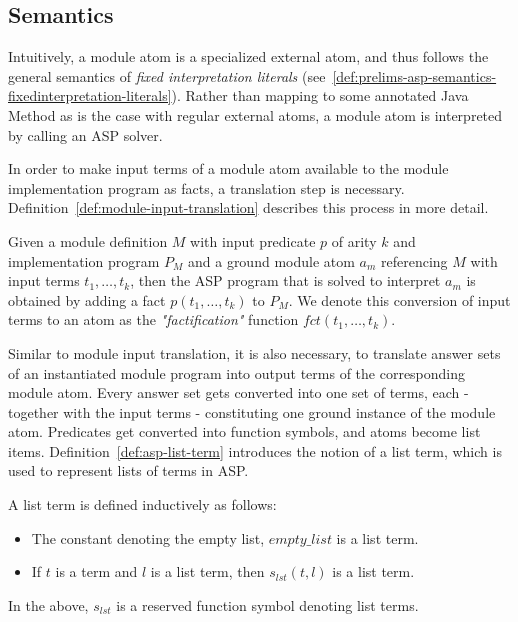 \subsection{Semantics}
\label{subsec:evolog-modules-semantics}

Intuitively, a module atom is a specialized external atom, and thus follows the general semantics of \emph{fixed interpretation literals} (see~\ref{def:prelims-asp-semantics-fixedinterpretation-literals}). Rather than mapping to some annotated Java Method as is the case with regular external atoms, a module atom is interpreted by calling an ASP solver.

In order to make input terms of a module atom available to the module implementation program as facts, a translation step is necessary. Definition~\ref{def:module-input-translation} describes this process in more detail.

\begin{definition}
\label{def:module-input-translation}
Given a module definition $M$ with input predicate $p$ of arity $k$ and implementation program $P_M$ and a ground module atom $a_m$ referencing $M$ with input terms $t_1,\ldots,t_k$, then the ASP program that is solved to interpret $a_m$ is obtained by adding a fact $p(t_1,\ldots,t_k)$ to $P_M$. We denote this conversion of input terms to an atom as the \emph{"factification"} function $\mathit{fct(t_1,\ldots,t_k)}$.
\end{definition}	

Similar to module input translation, it is also necessary, to translate answer sets of an instantiated module program into output terms of the corresponding module atom. Every answer set gets converted into one set of terms, each - together with the input terms - constituting one ground instance of the module atom. Predicates get converted into function symbols, and atoms become list items. Definition~\ref{def:asp-list-term} introduces the notion of a list term, which is used to represent lists of terms in ASP.

\begin{definition}
\label{def:asp-list-term}
A list term is defined inductively as follows:
\begin{itemize}
		\item The constant denoting the empty list, $\mathit{empty\_list}$ is a list term.
		\item If $t$ is a term and $l$ is a list term, then $s_{lst}(t, l)$ is a list term.
\end{itemize}	
In the above, $s_{lst}$ is a reserved function symbol denoting list terms.
\end{definition}	

